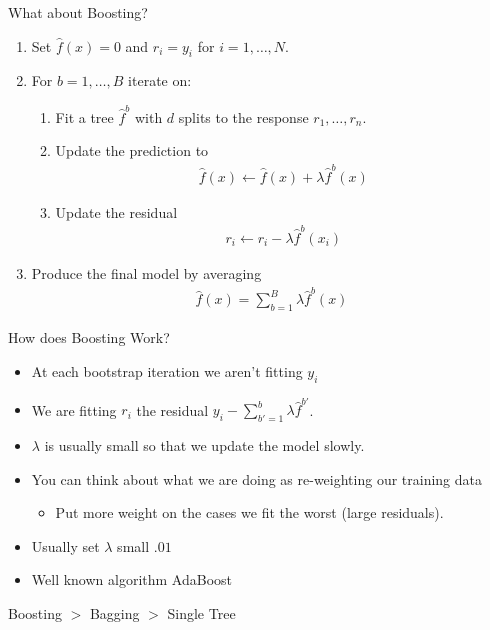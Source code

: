 \documentclass[xcolor=pdftex,dvipsnames,table,mathserif,aspectratio=169]{beamer}
\begin{document}
\begin{frame}{What about Boosting?}
\begin{enumerate}
\item Set $\hat{f}(x) = 0$ and $r_i = y_i$ for $i=1,\ldots, N$.
\item For $b=1,\ldots,B$ iterate on:
\begin{enumerate}
\item Fit a tree $\hat{f}^b$ with $d$ splits to the response $r_1,\ldots, r_n$.
\item Update the prediction to
\begin{align*}
\hat{f}(x) \leftarrow \hat{f}(x)+\lambda \hat{f}^{b}(x)
\end{align*}
\item Update the residual
\begin{align*}
r_{i} \leftarrow r_{i}-\lambda \hat{f}^{b}\left(x_{i}\right)
\end{align*}
\end{enumerate}
\item Produce the final model by averaging
\begin{align*}
\hat{f}(x)=\sum_{b=1}^{B} \lambda \hat{f}^{b}(x)
\end{align*}
\end{enumerate}
\end{frame}


\begin{frame}{How does Boosting Work?}
\begin{itemize}
\item At each bootstrap iteration we aren't fitting $y_i$
\item We are fitting $r_i$ the residual $y_i - \sum_{b'=1}^{b} \lambda \hat{f}^{b'}$. 
\item $\lambda$ is usually small so that we update the model \alert{slowly}.
\item You can think about what we are doing as \alert{re-weighting our training data}
\begin{itemize}
\item Put more weight on the cases we fit the worst (large residuals).
\end{itemize}
\item Usually set $\lambda$ small $.01$
\item Well known algorithm \alert{AdaBoost}
\end{itemize}
Boosting $>$ Bagging $>$ Single Tree
\end{frame}
\end{document}

